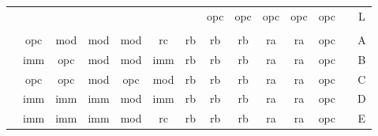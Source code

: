 \begin{table}
\begin{tabular}{c|c|c|c|c|c|c|c|c|c|c|c|r|c|}
\cline{8-12}\cline{14-14}
\multicolumn{1}{c}{}            & \multicolumn{1}{c}{} & \multicolumn{1}{c}{} & \multicolumn{1}{c}{} & \multicolumn{1}{c}{} & \multicolumn{1}{c}{} &                       & opc                  & opc                  & opc                  & opc                  & opc                  &                       & L                            \\ 
\cline{8-12}\cline{14-14}
\multicolumn{1}{l}{}            & \multicolumn{1}{l}{} & \multicolumn{1}{l}{} & \multicolumn{1}{l}{} & \multicolumn{1}{l}{} & \multicolumn{1}{l}{} & \multicolumn{1}{l}{}  & \multicolumn{1}{l}{} & \multicolumn{1}{l}{} & \multicolumn{1}{l}{} & \multicolumn{1}{l}{} & \multicolumn{1}{l}{} & \multicolumn{1}{l}{}  & \multicolumn{1}{l}{}         \\ 
\cline{2-12}\cline{14-14}
                                & opc                  & mod                  & mod                  & mod                  & rc                   & rb                    & rb                   & rb                   & ra                   & ra                   & opc                  &                       & A                            \\ 
\cline{2-12}\cline{14-14}
                                & imm                  & opc                  & mod                  & mod                  & imm                  & rb                    & rb                   & rb                   & ra                   & ra                   & opc                  &                       & B                            \\ 
\cline{2-12}\cline{14-14}
                                & opc                  & opc                  & mod                  & opc                  & mod                  & rb                    & rb                   & rb                   & ra                   & ra                   & opc                  &                       & C                            \\ 
\cline{2-12}\cline{14-14}
                                & imm                  & imm                  & imm                  & mod                  & imm                  & rb                    & rb                   & rb                   & ra                   & ra                   & opc                  &                       & D                            \\ 
\cline{2-12}\cline{14-14}
                                & imm                  & imm                  & imm                  & mod                  & rc                   & rb                    & rb                   & rb                   & ra                   & ra                   & opc                  &                       & E                            \\ 

\end{tabular}
\end{table}

